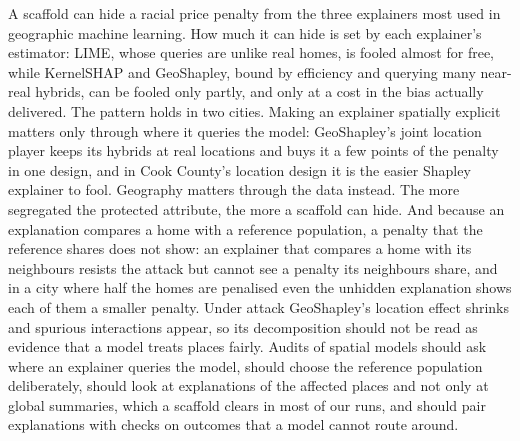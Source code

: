 A scaffold can hide a racial price penalty from the three explainers most used in geographic machine learning. How
much it can hide is set by each explainer's estimator: LIME, whose queries are unlike real homes, is fooled almost for
free, while KernelSHAP and GeoShapley, bound by efficiency and querying many near-real hybrids, can be fooled only
partly, and only at a cost in the bias actually delivered. The pattern holds in two cities. Making an explainer spatially explicit matters only through
where it queries the model: GeoShapley's joint location player keeps its hybrids at real locations and buys it a few
points of the penalty in one design, and in Cook County's location design it is the easier Shapley explainer to fool.
Geography matters through the data instead. The more segregated the protected attribute, the more a scaffold can hide.
And because an explanation compares a home with a reference population, a penalty that the reference shares does not
show: an explainer that compares a home with its neighbours resists the attack but cannot see a penalty its
neighbours share, and in a city where half the homes are penalised even the unhidden explanation shows each of them
a smaller penalty. Under attack GeoShapley's location effect shrinks and spurious interactions
appear, so its decomposition should not be read as evidence that a model treats places fairly. Audits of spatial
models should ask where an explainer queries the model, should choose the reference population deliberately, should
look at explanations of the affected places and not only at global summaries, which a scaffold clears in most of our
runs, and should pair explanations with checks on outcomes that a model cannot route around.
